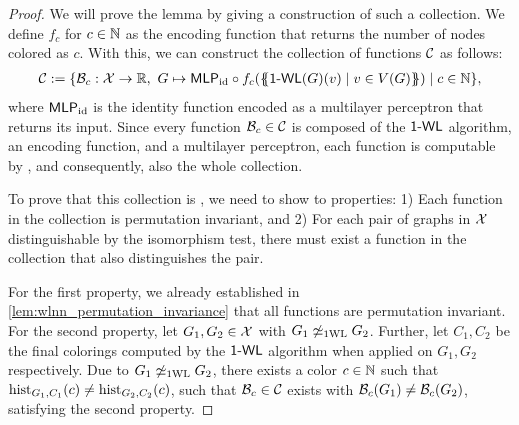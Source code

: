 \begin{proof}
    We will prove the lemma by giving a construction of such a collection.
    We define $f_c$ for $c \in \mathbb{N}$ as the encoding function that returns the number of nodes colored as $c$. With this, we can construct the collection of functions $\mathcal{C}$ as follows:
    \begin{align*}
        \mathcal{C} := \{ \mathcal{B}_c: \mathcal{X} \rightarrow \mathbb{R}, \ G \mapsto \textsf{MLP}_\text{id} \circ f_c (\{\!\!\{ \textsf{1-WL}(G)(v) \mid v \in V(G) \}\!\!\}) \mid c \in \mathbb{N}\},
    \end{align*}
    where $\textsf{MLP}_\text{id}$ is the identity function encoded as a multilayer perceptron that returns its input. Since every function $\mathcal{B}_c \in \mathcal{C}$ is composed of the $\textsf{1-WL}$ algorithm, an encoding function, and a multilayer perceptron, each function is computable by \wlnn, and consequently, also the whole collection.
    
    To prove that this collection is \wldisc, we need to show to properties: 1) Each function in the collection is permutation invariant, and 2) For each pair of graphs in $\mathcal{X}$ distinguishable by the \wl isomorphism test, there must exist a function in the collection that also distinguishes the pair. 
    
    For the first property, we already established in \cref{lem:wlnn_permutation_invariance} that all \wlnn functions are permutation invariant. For the second property, let $G_1, G_2 \in \mathcal{X}$ with $G_1 \not\simeq_{\text{1WL}} G_2$. Further, let $C_1, C_2$ be the final colorings computed by the $\textsf{1-WL}$ algorithm when applied on $G_1, G_2$ respectively. Due to $G_1 \not\simeq_{\text{1WL}} G_2$, there exists a color $c \in \mathbb{N}$ such that $\operatorname{hist}_{G_1,C_1}(c) \neq \operatorname{hist}_{G_2,C_2}(c)$, such that $\mathcal{B}_c \in \mathcal{C}$ exists with $\mathcal{B}_c(G_1) \neq \mathcal{B}_c(G_2)$, satisfying the second property.
\end{proof}

